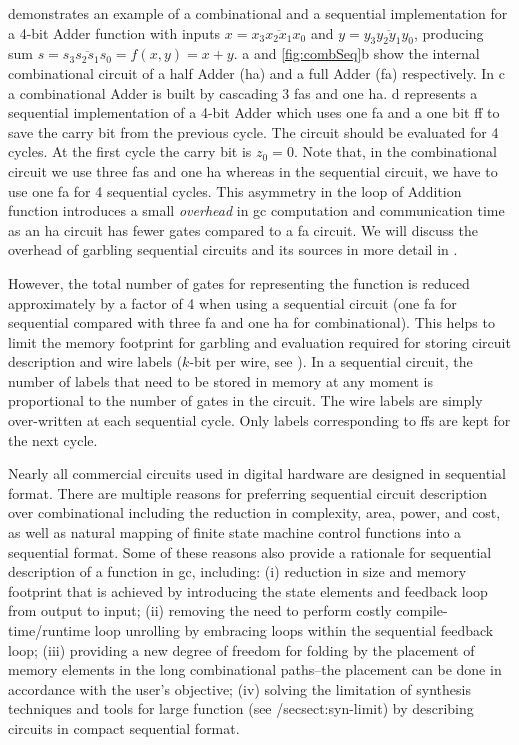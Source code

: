  demonstrates an example of a combinational and a sequential implementation for a 4-bit Adder function with inputs $x = \overline{x_3x_2x_1x_0}$ and $y = \overline{y_3y_2y_1y_0}$, producing sum $s = \overline{s_3s_2s_1s_0} = f(x, y) = x + y$.
a and \ref{fig:combSeq}b show the internal combinational circuit of a half Adder (\acrshort{ha}) and a full Adder (\acrshort{fa}) respectively.
In c a combinational Adder is built by cascading 3 \acrshort{fa}s and one \acrshort{ha}.
d represents a sequential implementation of a 4-bit Adder which uses one \acrshort{fa} and a one bit \acrshort{ff} to save the carry bit from the previous cycle.
The circuit should be evaluated for 4 cycles.
At the first cycle the carry bit is $z_0=0$.
Note that, in the combinational circuit we use three \acrshort{fa}s and one \acrshort{ha} whereas in the sequential circuit, we have to use one \acrshort{fa} for 4 sequential cycles.
This asymmetry in the loop of Addition function introduces a small \emph{overhead} in \acrshort{gc} computation and communication time as an \acrshort{ha} circuit has fewer gates compared to a \acrshort{fa} circuit.
We will discuss the overhead of garbling sequential circuits and its sources in more detail in .

However, the total number of gates for representing the function is reduced approximately by a factor of 4 when using a sequential circuit (one \acrshort{fa} for sequential compared with three \acrshort{fa} and one \acrshort{ha} for combinational).
This helps to limit the memory footprint for garbling and evaluation required for storing circuit description and wire labels ($k$-bit per wire, see ).
In a sequential circuit, the number of labels that need to be stored in memory at any moment is proportional to the number of gates in the circuit.
The wire labels are simply over-written at each sequential cycle.
Only labels corresponding to \acrshort{ff}s are kept for the next cycle.

Nearly all commercial circuits used in digital hardware are designed in sequential format.
There are multiple reasons for preferring sequential circuit description over combinational including the reduction in complexity, area, power, and cost, as well as natural mapping of finite state machine control functions into a sequential format.
Some of these reasons also provide a rationale for sequential description of a function in \acrshort{gc}, including: (i) reduction in size and memory footprint that is achieved by introducing the state elements and feedback loop from output to input; (ii) removing the need to perform costly compile-time/runtime loop unrolling by embracing loops within the sequential feedback loop; (iii) providing a new degree of freedom for folding by the placement of memory elements in the long combinational paths--the placement can be done in accordance with the user's objective; (iv) solving the limitation of synthesis techniques and tools for large function (see /sec{sect:syn-limit}) by describing circuits in compact sequential format.

